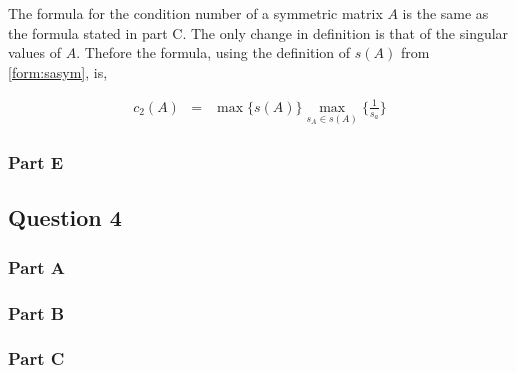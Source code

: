 The formula for the condition number of a symmetric matrix \(A\) is the same as the formula stated in part C.
The only change in definition is that of the singular values of \(A\).
Thefore the formula, using the definition of \(s(A)\) from \ref{form:sasym}, is,

\begin{eqnarray}
  c_2(A) &=& \max \{s(A)\} \max_{s_A \in s(A)} \{\frac{1}{s_a}\}
\end{eqnarray}

\newpage
\subsubsection{Part E}





\newpage
\subsection{Question 4}

\subsubsection{Part A}



\subsubsection{Part B}



\newpage
\subsubsection{Part C}

